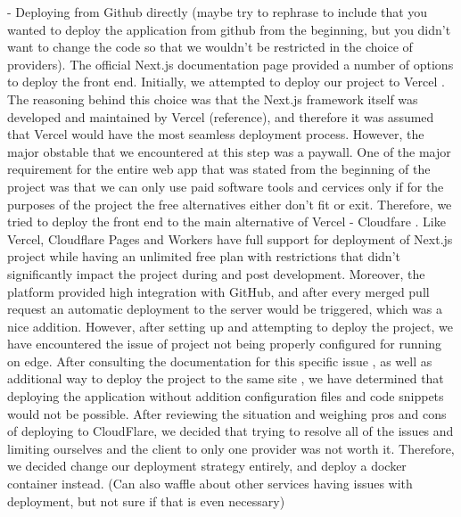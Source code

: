 - Deploying from Github directly (maybe try to rephrase to include that you wanted to deploy the application from github from the beginning, but you didn't want to change the code so that we wouldn't be restricted in the choice of providers).
The official Next.js documentation page \cite{vercelMainDeploymentMainPage} provided a number of options to deploy the front end. Initially, we attempted to deploy our project to Vercel \cite{Next.jsonVercel}. The reasoning behind this choice was that the Next.js framework itself was developed and maintained by Vercel (reference), and therefore it was assumed that Vercel would have the most seamless deployment process. However, the major obstable that we encountered at this step was a paywall. One of the major requirement for the entire web app that was stated from the beginning of the project was that we can only use paid software tools and cervices only if for the purposes of the project the free alternatives either don't fit or exit. Therefore, we tried to deploy the front end to the main alternative of Vercel - Cloudfare \cite{cloudflareMainPage}. Like Vercel, Cloudflare Pages and Workers have full support for deployment of Next.js project \cite{cloudflareWorkersMainPage} while having an unlimited free plan with restrictions that didn't significantly impact the project during and post development. Moreover, the platform provided high integration with GitHub, and after every merged pull request an automatic deployment to the server would be triggered, which was a nice addition. However, after setting up and attempting to deploy the project, we have encountered the issue of project not being properly configured for running on edge. After consulting the documentation for this specific issue \cite{APIReferenceEdgeRuntime}, as well as additional way to deploy the project to the same site \cite{Next.jsCloudflareDocs}, we have determined that deploying the application without addition configuration files and code snippets would not be possible. After reviewing the situation and weighing pros and cons of deploying to CloudFlare, we decided that trying to resolve all of the issues and limiting ourselves and the client to only one provider was not worth it. Therefore, we decided change our deployment strategy entirely, and deploy a docker container instead. (Can also waffle about other services having issues with deployment, but not sure if that is even necessary)

